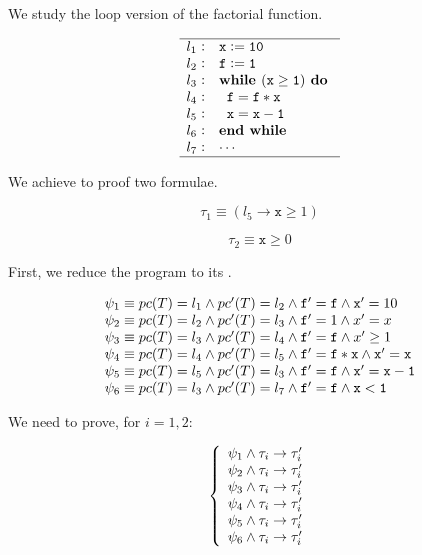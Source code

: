 


We study the loop version of the factorial function.


\[
	\begin{array}{l@{\hspace{0.3em}}c@{\hspace{1em}}l}
	\hline
		l_1 & : & \mathtt{x := 10} \\
		l_2 & : & \mathtt{f := 1} \\
		l_3 & : & \mathtt{\textbf{while } (x\geq 1) \textbf{ do }} \\
		l_4 & : & \mathtt{\;\;f = f*x} \\
		l_5 & : & \mathtt{\;\;x=x-1} \\ 	
		l_6 & : & \mathtt{\textbf{end while}}\\
		l_7 & : & \mathtt{\cdots}\\
	\hline
	\end{array}
\]
\label{simple:example}




We achieve to proof two formulae.

\[\tau_1 \equiv (l_5 \to \mathtt{x}\geq 1)\]

\[\tau_2 \equiv \mathtt{x} \geq 0\]




First, we reduce the program to its \VC.


\[
	\begin{array}{l}
		 \psi_1 \equiv pc(T) = l_1 \wedge pc'(T) = l_2 \wedge \mathtt{f'=f} \wedge \mathtt{x}' = 10\\
		 \psi_2 \equiv pc(T) = l_2 \wedge pc'(T) = l_3 \wedge \mathtt{f}' = 1 \wedge x'=x\\
		 \psi_3 \equiv pc(T) = l_3 \wedge pc'(T) = l_4 \wedge \mathtt{f'=f} \wedge x'\geq 1\\
		 \psi_4 \equiv pc(T) = l_4 \wedge pc'(T) = l_5 \wedge \mathtt{f}' = \mathtt{f*x} \wedge \mathtt{x'=x}\\
		 \psi_5 \equiv pc(T) = l_5 \wedge pc'(T) = l_3 \wedge \mathtt{f'=f} \wedge \mathtt{x'=x-1}\\
		 \psi_6 \equiv pc(T) = l_3 \wedge pc'(T) = l_7 \wedge \mathtt{f'=f} \wedge \mathtt{x<1}
	\end{array}
\]

We need to prove, for $i=1,2$:

\[
	\left\{
		\begin{array}{l}
			\psi_1 \wedge \tau_i \to \tau_i'\\
			\psi_2 \wedge \tau_i \to \tau_i'\\
			\psi_3 \wedge \tau_i \to \tau_i'\\
			\psi_4 \wedge \tau_i \to \tau_i'\\
			\psi_5 \wedge \tau_i \to \tau_i'\\
			\psi_6 \wedge \tau_i \to \tau_i'\\
		\end{array}
	\right.
\]

